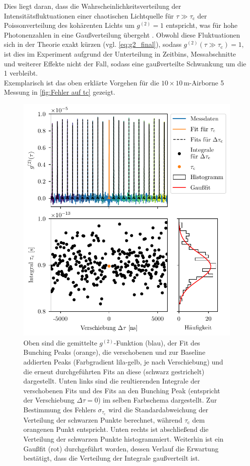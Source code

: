 Dies liegt daran, dass die Wahrscheinlichkeitsverteilung der Intensitätsfluktuationen einer chaotischen Lichtquelle für $\tau\gg \tau_{\mathrm{c}}$ der Poissonverteilung des kohärenten Lichts um $g^{(2)}=1$ entspricht, was für hohe Photonenzahlen in eine Gaußverteilung übergeht \cite[Kap. 5.5]{foxQuantumOpticsIntroduction2006}.
Obwohl diese Fluktuationen sich in der Theorie exakt kürzen (vgl. \autoref{eq:g2_final}), sodass $g^{(2)}(\tau \gg \tau_{\mathrm{c}}) = 1$, ist dies im Experiment aufgrund der Unterteilung in Zeitbins, Messabschnitte und weiterer Effekte nicht der Fall, sodass eine gaußverteilte Schwankung um die 1 verbleibt.  \\

Exemplarisch ist das oben erklärte Vorgehen für die $10\times 10\,\mathrm{m}$-Airborne 5 Messung in \autoref{fig:Fehler auf tc} gezeigt. 
\begin{figure}[hp]
    \centering
    \includegraphics{images/Analysis/integration_error.pdf}
    \caption{Oben sind die gemittelte $g^{(2)}$-Funktion (blau), der Fit des Bunching Peaks (orange), die verschobenen und zur Baseline addierten Peaks (Farbgradient lila-gelb, je nach Verschiebung) und die erneut durchgeführten Fits an diese (schwarz gestrichelt) dargestellt. Unten links sind die reultierenden Integrale der verschobenen Fits und des Fits an den Bunching Peak (entspricht der Verschiebung $\Delta\tau=0$) im selben Farbschema dargestellt. Zur Bestimmung des Fehlers $\sigma_{\tau_{\mathrm{c}}}$ wird die Standardabweichung der Verteilung der schwarzen Punkte berechnet, während $\tau_{\mathrm{c}}$ dem orangenen Punkt entspricht. Unten rechts ist abschließend die Verteilung der schwarzen Punkte histogrammiert. Weiterhin ist ein Gaußfit (rot) durchgeführt worden, dessen Verlauf die Erwartung bestätigt, dass die Verteilung der Integrale gaußverteilt ist.}
    \label{fig:Fehler auf tc}
\end{figure}
